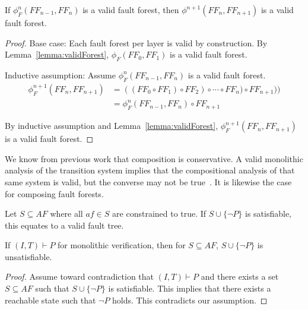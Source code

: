 \begin{theorem} If $\phi_F^n(\mathit{FF}_{n-1}, \mathit{FF}_n)$ is a valid fault forest, then $\phi^{n+1}(\mathit{FF}_{n}, \mathit{FF}_{n+1})$ is a valid fault forest.
\begin{proof}

Base case: Each fault forest per layer is valid by construction. By Lemma~\ref{lemma:validForest}, $\phi_F(\mathit{FF}_{0}, \mathit{FF}_1)$ is a valid fault forest.

Inductive assumption: Assume $\phi_F^n(\mathit{FF}_{n-1}, \mathit{FF}_n)$ is a valid fault forest.
\begin{equation*}
\begin{split}
\phi_F^{n+1}(\mathit{FF}_{n}, \mathit{FF}_{n+1}) &= ((\mathit{FF}_0 \circ \mathit{FF}_1) \circ \mathit{FF}_2) \circ \cdots \circ \mathit{FF}_n) \circ \mathit{FF}_{n+1})) \\
  &= \phi_F^n(\mathit{FF}_{n-1}, \mathit{FF}_n) \circ \mathit{FF}_{n+1}
\end{split}
\end{equation*}


By inductive assumption and Lemma~\ref{lemma:validForest}, $\phi_F^{n+1}(\mathit{FF}_{n}, \mathit{FF}_{n+1})$ is a valid fault forest.

\end{proof}
\label{thm:indForest}
\end{theorem}

We know from previous work that composition is conservative. A valid monolithic analysis of the transition system implies that the compositional analysis of that same system is valid, but the converse may not be true~\cite{ghassabani_2018}. It is likewise the case for composing fault forests. 

Let $S \subseteq \mathit{AF}$ where all $\mathit{af} \in S$ are constrained to true. If $S \cup \{\neg P\}$ is satisfiable, this equates to a valid fault tree. 

\begin{theorem} If $(I,T) \vdash P$ for monolithic verification, then for $S \subseteq \mathit{AF}$, $S \cup \{\neg P\}$ is unsatisfiable.
\begin{proof}
Assume toward contradiction that $(I,T) \vdash P$ and there exists a set $S \subseteq \mathit{AF}$ such that $S \cup \{\neg P\}$ is satisfiable. This implies that there exists a reachable state such that $\neg P$ holds. This contradicts our assumption. 
\end{proof}
\label{thm:sound}
\end{theorem}


